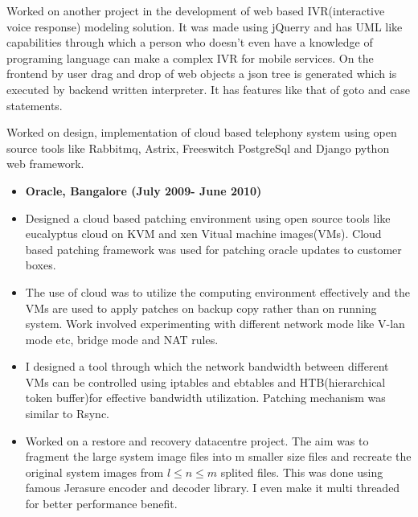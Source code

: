 \documentclass[]{res}
\newcommand{\resitem}[1]{\item #1 \vspace{-2pt}}
\begin{document}
\begin{description}
\begin{itemize}
{\item Worked on another project in the development of web based IVR(interactive voice response) modeling solution. It was made using jQuerry and has UML like capabilities through which a person who doesn't even  have a knowledge of programing language can make a complex IVR for mobile services. On the frontend by user drag and drop of web objects a json tree is generated which is executed by backend written interpreter. It has features like that of goto and case statements.


\item Worked on design, implementation of cloud based telephony system using open source tools like Rabbitmq, Astrix, Freeswitch  PostgreSql and Django python web framework.

}
\end {itemize}


\item[]
\begin{itemize}
\item \textbf{ Oracle, Bangalore    (July 2009- June 2010)}\\

\item Designed a cloud based patching environment using open source tools like eucalyptus cloud on KVM and xen Vitual machine images(VMs). Cloud based patching framework was used for patching oracle updates to customer boxes.



\item The use of cloud was to utilize the computing environment effectively and the VMs are used to apply patches on backup copy rather than on running system. Work involved experimenting with different network mode like V-lan mode etc, bridge mode and NAT rules. 



\item  I designed a tool through which the network bandwidth between different VMs can be controlled using iptables and ebtables and HTB(hierarchical token buffer)for effective bandwidth utilization. Patching mechanism was similar to Rsync.  



\resitem{ Worked on a restore and recovery datacentre project. The aim was to fragment the  large system image files into m smaller size files and recreate the original system images from  $l \leq{ n} \leq{ m}$ splited files. This was done using famous Jerasure encoder and decoder library. I even make it multi threaded for better performance benefit.}   


\end{itemize}
\end{description}
\end{document}
